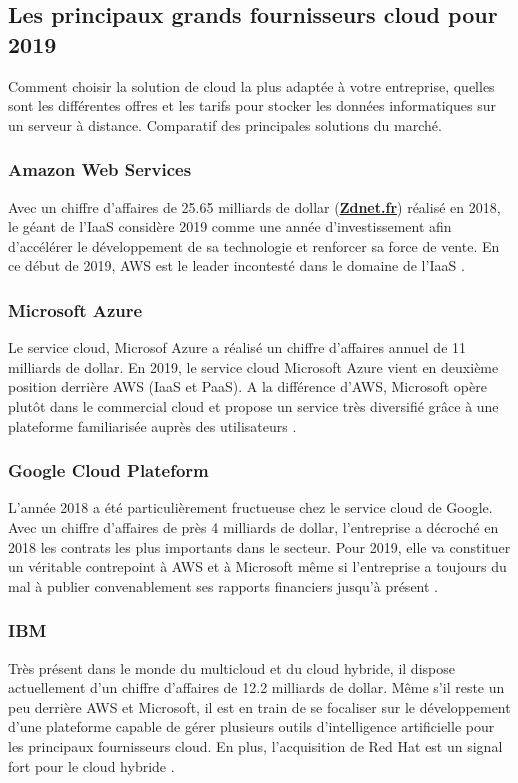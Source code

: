 \subsection{Les principaux grands fournisseurs cloud pour 2019}  


Comment choisir la solution de cloud la plus adaptée à votre entreprise, quelles sont les différentes offres et les tarifs pour stocker les données informatiques sur un serveur à distance. Comparatif des principales solutions du marché.

\subsubsection{Amazon Web Services }

Avec un chiffre d’affaires de 25.65 milliards de dollar (\textbf{\underline{Zdnet.fr}}) réalisé en 2018, le géant de l’IaaS considère 2019 comme une année d’investissement afin d’accélérer le développement de sa technologie et renforcer sa force de vente. En ce début de 2019, AWS est le leader incontesté dans le domaine de l’IaaS \parencite{cloud2019}.

\subsubsection{Microsoft Azure}
Le service cloud, Microsof Azure a réalisé un chiffre d’affaires annuel de 11 milliards de dollar. En 2019, le service cloud Microsoft Azure vient en deuxième position derrière AWS (IaaS et PaaS). A la différence d’AWS, Microsoft opère plutôt dans le commercial cloud et propose un service très diversifié grâce à une plateforme familiarisée auprès des utilisateurs \parencite{cloud2019}.


\subsubsection{Google Cloud Plateform}
L’année 2018 a été particulièrement fructueuse chez le service cloud de Google. Avec un chiffre d’affaires de près 4 milliards de dollar, l’entreprise a décroché en 2018 les contrats les plus importants dans le secteur. Pour 2019, elle va constituer un véritable contrepoint à AWS et à Microsoft même si l’entreprise a toujours du mal à publier convenablement ses rapports financiers jusqu’à présent \parencite{cloud2019}.

\subsubsection{IBM}
Très présent dans le monde du multicloud et du cloud hybride, il dispose actuellement d’un chiffre d’affaires de 12.2 milliards de dollar. Même s’il reste un peu derrière AWS et Microsoft, il est en train de se focaliser sur le développement d’une plateforme capable de gérer plusieurs outils d’intelligence artificielle pour les principaux fournisseurs cloud. En plus, l’acquisition de Red Hat est un signal fort pour le cloud hybride \parencite{cloud2019}.

